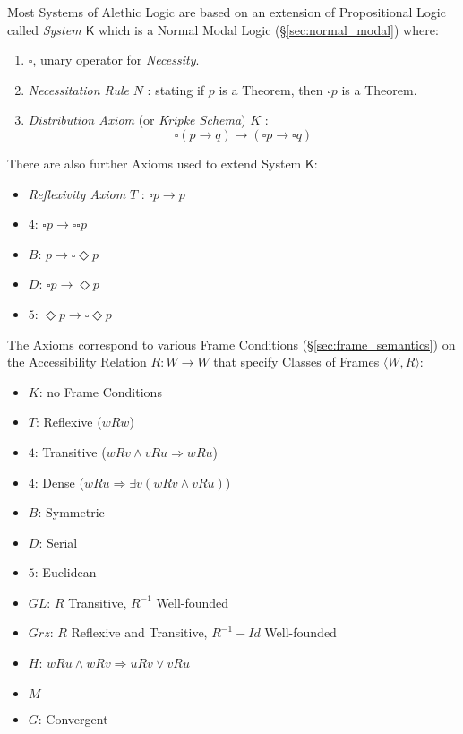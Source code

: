 Most Systems of Alethic Logic are based on an extension of
Propositional Logic called \emph{System $\mathsf{K}$} which is a
Normal Modal Logic (\S\ref{sec:normal_modal}) where:
\begin{enumerate}
\item $\square$, unary operator for \emph{Necessity}.
\item \emph{Necessitation Rule} $N$ : stating if $p$ is a
  Theorem, then $\square p$ is a Theorem.
\item \emph{Distribution Axiom} (or \emph{Kripke Schema}) $K$ :
  \[
    \square(p \rightarrow q) \rightarrow
    (\square p \rightarrow \square q)
  \]
\end{enumerate}
There are also further Axioms used to extend System $\mathsf{K}$:
\begin{itemize}
  \item \emph{Reflexivity Axiom} $T$ : $\square p \rightarrow p$
  \item $4$: $\square p \rightarrow \square \square p$
  \item $B$: $p \rightarrow \square \Diamond p$
  \item $D$: $\square p \rightarrow \Diamond p$
  \item $5$: $\Diamond p \rightarrow \square \Diamond p$
\end{itemize}
The Axioms correspond to various Frame Conditions
(\S\ref{sec:frame_semantics}) on the Accessibility Relation $R : W
\rightarrow W$ that specify Classes of Frames $\langle W,R \rangle$:
\begin{itemize}
  \item $K$: no Frame Conditions
  \item $T$: Reflexive ($wRw$)
  \item $4$: Transitive ($wRv \wedge vRu \Rightarrow wRu$)
  \item $4$: Dense ($wRu \Rightarrow \exists v (w R v \wedge v R u)$)
  \item $B$: Symmetric
  \item $D$: Serial
  \item $5$: Euclidean
  \item $GL$: $R$ Transitive, $R^{-1}$ Well-founded
  \item $Grz$: $R$ Reflexive and Transitive, $R^{-1} - Id$
    Well-founded
  \item $H$: $w R u \wedge w R v \Rightarrow u R v \vee v R u$
  \item $M$
  \item $G$: Convergent
\end{itemize}
